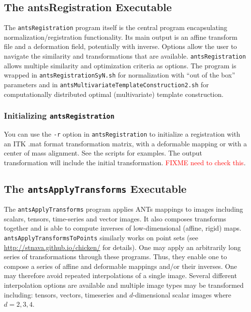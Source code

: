 \documentclass{InsightArticle}
\begin{document}
\subsection{The antsRegistration Executable}
The \texttt{antsRegistration} program itself is the central program encapsulating
normalization/registration functionality.  Its main output is an
affine transform file and a deformation field, potentially with
inverse.  Options allow the user to navigate the similarity
and transformations that are available.  \texttt{antsRegistration} allows multiple
similarity and optimization criteria as options.  The program is
wrapped in \texttt{antsRegistrationSyN.sh} for normalization with ``out of the box''
parameters and in \texttt{antsMultivariateTemplateConstruction2.sh} for 
computationally distributed optimal (multivariate) template construction.

\subsubsection{Initializing \texttt{antsRegistration}}
You can use the  \texttt{-r} option in \texttt{antsRegistration} to
initialize a registration with an ITK .mat format transformation matrix, with a
deformable mapping or with a center of mass alignment.  See the
scripts for examples.  The output transformation will include the
initial transformation. \textcolor{red}{FIXME need to check this}.


\subsection{The \texttt{antsApplyTransforms} Executable}
The \texttt{antsApplyTransforms} program applies ANTs mappings to
images including scalars, tensors, time-series and vector images.  
It also composes transforms together and is able to compute
inverses of low-dimensional (affine, rigid) maps.  
\texttt{antsApplyTransformsToPoints} similarly works on point sets (see
\href{http://stnava.github.io/chicken/}{http://stnava.github.io/chicken/} for details).  One may apply an 
arbitrarily long series of transformations through these programs.  Thus, they enable one 
to compose a series of affine and deformable mappings and/or their
inverses.  One may therefore avoid repeated interpolations of a single
image.  Several different
interpolation options are available and multiple image types may be
transformed including:   tensors, vectors, timeseries and
$d$-dimensional scalar images where $d=2, 3, 4$.
\end{document}
